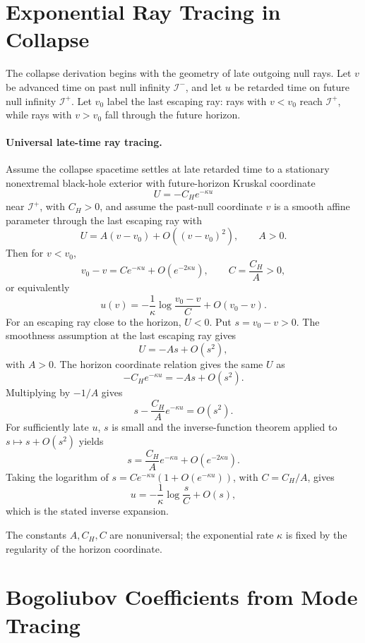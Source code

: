 \section{Exponential Ray Tracing in Collapse}

The collapse derivation begins with the geometry of late outgoing null rays.
Let \(v\) be advanced time on past null infinity \(\mathcal I^-\), and let
\(u\) be retarded time on future null infinity \(\mathcal I^+\).  Let \(v_0\)
label the last escaping ray: rays with \(v<v_0\) reach \(\mathcal I^+\),
while rays with \(v>v_0\) fall through the future horizon.

\paragraph{Universal late-time ray tracing.}
Assume the collapse spacetime settles at late retarded time to a stationary
nonextremal black-hole exterior with future-horizon Kruskal coordinate
\[
  U=-C_H e^{-\kappa u}
\]
near \(\mathcal I^+\), with \(C_H>0\), and assume the past-null coordinate
\(v\) is a smooth affine parameter through the last escaping ray with
\[
  U=A(v-v_0)+O((v-v_0)^2),
  \qquad A>0 .
\]
Then for \(v<v_0\),
\[
  v_0-v=C e^{-\kappa u}+O(e^{-2\kappa u}),
  \qquad C=\frac{C_H}{A}>0,
\]
or equivalently
\[
  u(v)=-\frac1\kappa\log\frac{v_0-v}{C}+O(v_0-v).
\]
For an escaping ray close to the horizon, \(U<0\).  Put \(s=v_0-v>0\).  The
smoothness assumption at the last escaping ray gives
\[
  U=-As+O(s^2),
\]
with \(A>0\).  The horizon coordinate relation gives the same \(U\) as
\[
  -C_H e^{-\kappa u}
  =
  -As+O(s^2).
\]
Multiplying by \(-1/A\) gives
\[
  s-\frac{C_H}{A}e^{-\kappa u}=O(s^2).
\]
For sufficiently late \(u\), \(s\) is small and the inverse-function theorem
applied to \(s\mapsto s+O(s^2)\) yields
\[
  s=\frac{C_H}{A}e^{-\kappa u}+O(e^{-2\kappa u}).
\]
Taking the logarithm of
\(s=C e^{-\kappa u}(1+O(e^{-\kappa u}))\), with \(C=C_H/A\), gives
\[
  u=-\frac1\kappa\log\frac{s}{C}+O(s),
\]
which is the stated inverse expansion.

The constants \(A,C_H,C\) are nonuniversal; the exponential rate \(\kappa\)
is fixed by the regularity of the horizon coordinate.

\section{Bogoliubov Coefficients from Mode Tracing}

